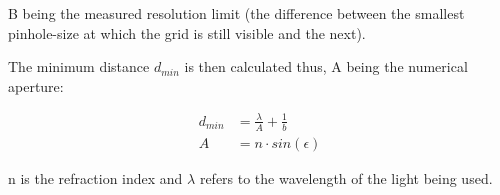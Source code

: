 B being the measured resolution limit (the difference between the smallest pinhole-size at which the grid is still visible and 
the next). 

The minimum distance $d_{min}$ is then calculated thus, A being the numerical aperture:

\begin{align*}
  d_{min} &= \frac{\lambda}{A} + \frac{1}{b} \tag{15} \\
  A &= n \cdot sin(\epsilon) \tag{16} 
\end{align*}

n is the refraction index and $\lambda$ refers to the wavelength of the light being used.

\newpage
